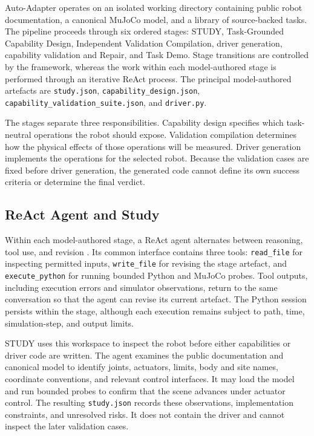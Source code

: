 Auto-Adapter operates on an isolated working directory containing public robot
documentation, a canonical MuJoCo model, and a library of source-backed tasks.
The pipeline proceeds through six ordered stages: STUDY, Task-Grounded
Capability Design, Independent Validation Compilation, driver generation,
capability validation and Repair, and Task Demo. Stage transitions are
controlled by the framework, whereas the work within each model-authored stage
is performed through an iterative ReAct process. The principal model-authored
artefacts are \texttt{study.json}, \texttt{capability\_design.json},
\texttt{capability\_validation\_suite.json}, and \texttt{driver.py}.

The stages separate three responsibilities. Capability design specifies which
task-neutral operations the robot should expose. Validation compilation
determines how the physical effects of those operations will be measured.
Driver generation implements the operations for the selected robot. Because
the validation cases are fixed before driver generation, the generated code
cannot define its own success criteria or determine the final verdict.

\subsection{ReAct Agent and Study}

Within each model-authored stage, a ReAct agent alternates between reasoning,
tool use, and revision \citep{yao2023react}. Its common interface contains
three tools: \texttt{read\_file} for inspecting permitted inputs,
\texttt{write\_file} for revising the stage artefact, and
\texttt{execute\_python} for running bounded Python and MuJoCo probes. Tool
outputs, including execution errors and simulator observations, return to the
same conversation so that the agent can revise its current artefact. The
Python session persists within the stage, although each execution remains
subject to path, time, simulation-step, and output limits.

STUDY uses this workspace to inspect the robot before either capabilities or
driver code are written. The agent examines the public documentation and
canonical model to identify joints, actuators, limits, body and site names,
coordinate conventions, and relevant control interfaces. It may load the model
and run bounded probes to confirm that the scene advances under actuator
control. The resulting \texttt{study.json} records these observations,
implementation constraints, and unresolved risks. It does not contain the
driver and cannot inspect the later validation cases.

